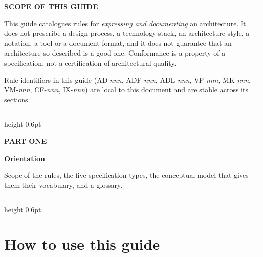 \documentclass[11pt,a4paper]{report}
\begin{document}
\begin{titlepage}
\begin{tcolorbox}[enhanced, sharp corners, boxrule=0.5pt, colframe=rulegrey,
                  colback=slatetint, left=5mm, right=5mm, top=4mm, bottom=4mm]
{\sffamily\bfseries\footnotesize\color{navy}SCOPE OF THIS GUIDE\par}
\vspace{2pt}\small
This guide catalogues rules for \emph{expressing and documenting} an architecture.
It does not prescribe a design process, a technology stack, an architecture style,
a notation, a tool or a document format, and it does not guarantee that an
architecture so described is a good one. Conformance is a property of a
specification, not a certification of architectural quality.
\end{tcolorbox}

\vspace{6mm}
{\sffamily\footnotesize\color{slate}
Rule identifiers in this guide (\textsf{AD-\textit{nnn}}, \textsf{ADF-\textit{nnn}},
\textsf{ADL-\textit{nnn}}, \textsf{VP-\textit{nnn}}, \textsf{MK-\textit{nnn}},
\textsf{VM-\textit{nnn}}, \textsf{CF-\textit{nnn}}, \textsf{IX-\textit{nnn}})
are local to this document and are stable across its sections.\par}
\end{titlepage}\hypersetup{pageanchor=true}

\tableofcontents
\clearpage
{}

\clearpage
\thispagestyle{empty}
\vspace*{60mm}
{\color{rulegrey}\hrule height 0.6pt}
\vspace{6mm}
{\sffamily\footnotesize\bfseries\color{steel}\MakeUppercase{Part One}\par}
\vspace{2mm}
{\sffamily\bfseries\fontsize{22}{26}\selectfont\color{navy}Orientation\par}
\vspace{5mm}
{\sffamily\small\color{slate}Scope of the rules, the five specification types, the conceptual model that gives them their vocabulary, and a glossary.\par}
\vspace{6mm}
{\color{rulegrey}\hrule height 0.6pt}
\clearpage

\chapter{How to use this guide}
\end{document}
